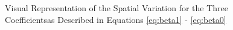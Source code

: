 \documentclass{article}\usepackage[]{graphicx}\usepackage[]{color}
\begin{document}
\begin{figure}
\caption{Visual Representation of the Spatial Variation for the Three Coefficientsas Described in Equations \eqref{eq:beta1} - \eqref{eq:beta0}}
\label{fig:spvarBeta}
\end{figure}


% 
% 
% 
% 
% 
% 
\end{document}
